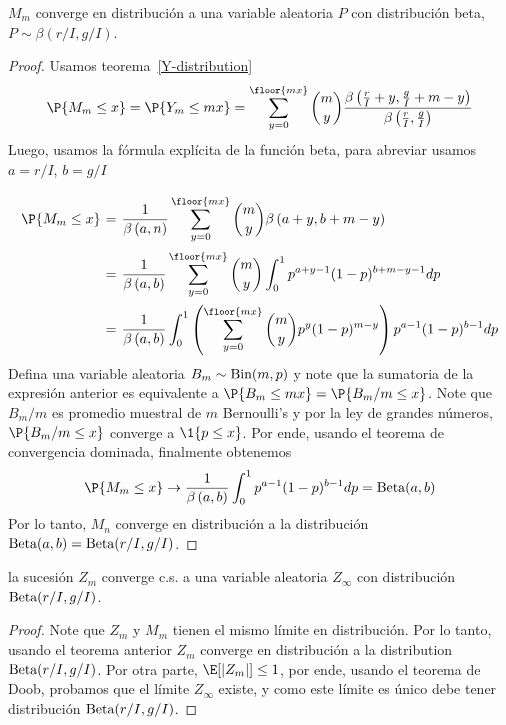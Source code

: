 \begin{theorem}
    $M_m$ converge en distribución a una variable aleatoria $P$ con distribución beta, $P \sim \beta(r/I, g/I)$.
\end{theorem}
\begin{proof}
    Usamos teorema~\ref{Y-distribution}
    \[ \P\{M_m \leq x\} = \P\{Y_m \leq mx\} = \sum_{y = 0}^{\floor{mx}} \binom{m}{y} \frac{\beta\left( \frac{r}{I} + y, \frac{g}{I} + m - y \right)}{\beta\left( \frac{r}{I}, \frac{g}{I} \right)}   \]
    Luego, usamos la fórmula explícita de la función beta, para abreviar usamos $a = r/I$, $b = g/I$
    \[ \everymath{\displaystyle}
    \arraycolsep=1.8pt\def\arraystretch{3}
    \begin{array}{rcl}
        \P\{M_m \leq x\} & = & \frac{1}{\beta\left( a, n \right)} \sum_{y = 0}^{\floor{mx}} \binom{m}{y} \beta\left( a + y, b + m - y \right) \\
        & = & \frac{1}{\beta\left( a, b \right)} \sum_{y = 0}^{\floor{mx}} \binom{m}{y} \int_0^1 p^{a + y-1} (1-p)^{b + m - y-1} dp\\
        & = & \frac{1}{\beta\left( a, b \right)} \int_0^1 \left( \sum_{y = 0}^{\floor{mx}} \binom{m}{y} p^y (1-p)^{m-y} \right) p^{a-1} (1-p)^{b-1} dp
    \end{array} \]
    Defina una variable aleatoria $B_m \sim \hbox{Bin}(m,p)$ y note que la sumatoria de la expresión anterior es equivalente a $\P\{B_m \leq mx\} = \P\{B_m/m \leq x\}$. Note que $B_m/m$ es promedio muestral de $m$ Bernoulli's y por la ley de grandes números, $\P\{B_m/m \leq x\}$ converge a $\1\{p \leq x\}$. Por ende, usando el teorema de convergencia dominada, finalmente obtenemos
    \[ \P\{M_m \leq x\} \to \frac{1}{\beta\left( a, b \right)} \int_0^1  p^{a-1} (1-p)^{b-1} dp = \hbox{Beta}(a,b)\]
    Por lo tanto, $M_n$ converge en distribución a la distribución $\hbox{Beta}(a,b) = \hbox{Beta}(r/I,g/I)$.
\end{proof}

\begin{corollary}
    la sucesión $Z_m$ converge c.s. a una variable aleatoria $Z_\infty$ con distribución $\hbox{Beta}(r/I,g/I)$.
\end{corollary}
\begin{proof}
    Note que $Z_m$ y $M_m$ tienen el mismo límite en distribución. Por lo tanto, usando el teorema anterior $Z_m$ converge en distribución a la distribution $\hbox{Beta}(r/I,g/I)$. Por otra parte, $\E[|Z_m|] \leq 1$, por ende, usando el teorema de Doob, probamos que el límite $Z_\infty$ existe, y como este límite es único debe tener distribución $\hbox{Beta}(r/I,g/I)$.
\end{proof}
